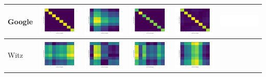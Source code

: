 \documentclass[12pt,german]{article}
\begin{document}
\begin{table}[H]
\begin{tabular}{| l | c | c | c | c | c |}
    \hline
    Google &
    \includegraphics[width=2.5cm]{../images/googleData/abstractData.jpg} &
    \includegraphics[width=2.5cm]{../images/googleData/dictData.jpg} &
    \includegraphics[width=2.5cm]{../images/googleData/facebookData.jpg} &
    \includegraphics[width=2.5cm]{../images/googleData/googleData.jpg} &
    \includegraphics[width=2.5cm]{../images/googleData/witzData.jpg} \\
    \hline
    Witz &
    \includegraphics[width=2.5cm]{../images/witzData/abstractData.jpg} &
    \includegraphics[width=2.5cm]{../images/witzData/dictData.jpg} &
    \includegraphics[width=2.5cm]{../images/witzData/facebookData.jpg} &
    \includegraphics[width=2.5cm]{../images/witzData/googleData.jpg} &

\end{tabular}
\end{table}
\end{document}
